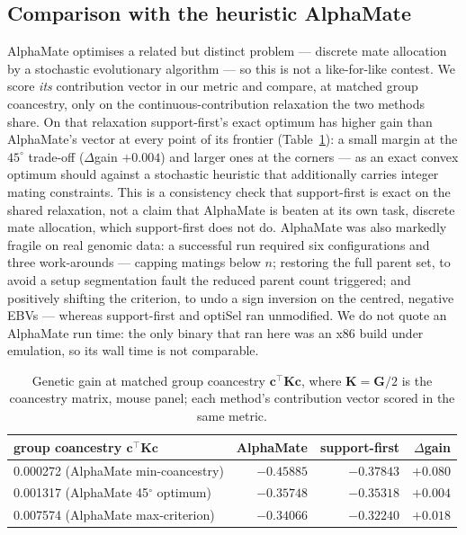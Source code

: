 \documentclass[11pt]{article}
\newcommand{\tp}{^{\top}}
\newcommand{\bc}{\mathbf{c}}
\newcommand{\bG}{\mathbf{G}}
\begin{document}
\subsection{Comparison with the heuristic AlphaMate}

AlphaMate optimises a related but distinct problem --- discrete mate allocation by a stochastic evolutionary algorithm --- so this is not a like-for-like contest. We score \emph{its} contribution vector in our metric and compare, at matched group coancestry, only on the continuous-contribution relaxation the two methods share. On that relaxation support-first's exact optimum has higher gain than AlphaMate's vector at every point of its frontier (Table~\ref{tab:alphamate}): a small margin at the $45^\circ$ trade-off ($\Delta$gain $+0.004$) and larger ones at the corners --- as an exact convex optimum should against a stochastic heuristic that additionally carries integer mating constraints. This is a consistency check that support-first is exact on the shared relaxation, not a claim that AlphaMate is beaten at its own task, discrete mate allocation, which support-first does not do. AlphaMate was also markedly fragile on real genomic data: a successful run required six configurations and three work-arounds --- capping matings below $n$; restoring the full parent set, to avoid a setup segmentation fault the reduced parent count triggered; and positively shifting the criterion, to undo a sign inversion on the centred, negative EBVs --- whereas support-first and optiSel ran unmodified. We do not quote an AlphaMate run time: the only binary that ran here was an x86 build under emulation, so its wall time is not comparable.

\begin{table}[ht]
\centering
\caption{Genetic gain at matched group coancestry $\bc\tp\mathbf{K}\bc$, where $\mathbf{K}=\bG/2$ is the coancestry matrix, mouse panel; each method's contribution vector scored in the same metric.}
\label{tab:alphamate}
\begin{tabular}{lrrr}
\toprule
group coancestry $\bc\tp\mathbf{K}\bc$ & AlphaMate & support-first & $\Delta$gain \\
\midrule
0.000272 (AlphaMate min-coancestry) & $-0.45885$ & $\mathbf{-0.37843}$ & $+0.080$ \\
0.001317 (AlphaMate 45$^\circ$ optimum) & $-0.35748$ & $\mathbf{-0.35318}$ & $+0.004$ \\
0.007574 (AlphaMate max-criterion) & $-0.34066$ & $\mathbf{-0.32240}$ & $+0.018$ \\
\bottomrule
\end{tabular}
\end{table}
\end{document}
